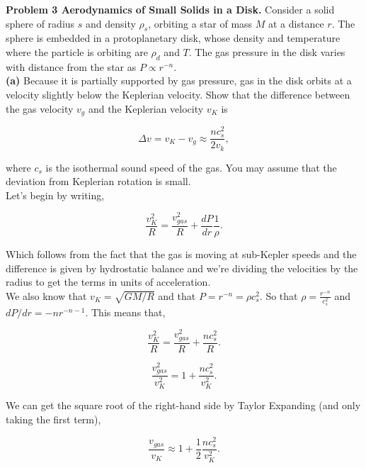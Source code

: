 \documentclass[12pt]{article}
\begin{document}
\noindent \textbf{Problem 3 Aerodynamics of Small Solids in a Disk.} Consider a solid sphere of radius $s$ and density $\rho_s$, orbiting a star of mass $M$ at a distance $r$. The sphere is embedded in a protoplanetary disk, whose density and temperature where the particle is orbiting are $\rho_d$ and $T$. The gas pressure in the disk varies with distance from the star as $P \propto r^{-n}$.  \\

\noindent \textbf{(a)} Because it is partially supported by gas pressure, gas in the disk orbits at a velocity slightly below the Keplerian velocity. Show that the difference between the gas velocity $v_g$ and the Keplerian velocity $v_K$ is 

\begin{equation}
\Delta v = v_K - v_g \approx \frac{nc_s^2}{2v_k},
\end{equation} 


\noindent where $c_s$ is the isothermal sound speed of the gas. You may assume that the deviation from Keplerian rotation is small. \\

\noindent Let's begin by writing, 

\begin{equation}
\frac{v_K^2}{R} = \frac{v_{gas}^2}{R} + \frac{dP}{dr}\frac{1}{\rho}.
\end{equation}

\noindent Which follows from the fact that the gas is moving at sub-Kepler speeds and the difference is given by hydrostatic balance and we're dividing the velocities by the radius to get the terms in units of acceleration. \\

\noindent We also know that $v_K = \sqrt{GM/R}$ and that $P = r^{-n} = \rho c_s^2$. So that $\rho = \frac{r^{-n}}{c_s^2}$ and $dP/dr = -nr^{-n-1}$. This means that, 

\begin{equation}
\frac{v_K^2}{R} = \frac{v_{gas}^2}{R} + \frac{nc_s^2}{R}.
\end{equation}

\begin{equation}
\frac{v_{gas}^2}{v_K^2} = 1 + \frac{nc_s^2}{v_K^2}.
\end{equation}

\noindent We can get the square root of the right-hand side by Taylor Expanding (and only taking the first term),

\begin{equation}
\frac{v_{gas}}{v_K} \approx 1 + \frac{1}{2}\frac{nc_s^2}{v_K^2}.
\end{equation}
\end{document}
